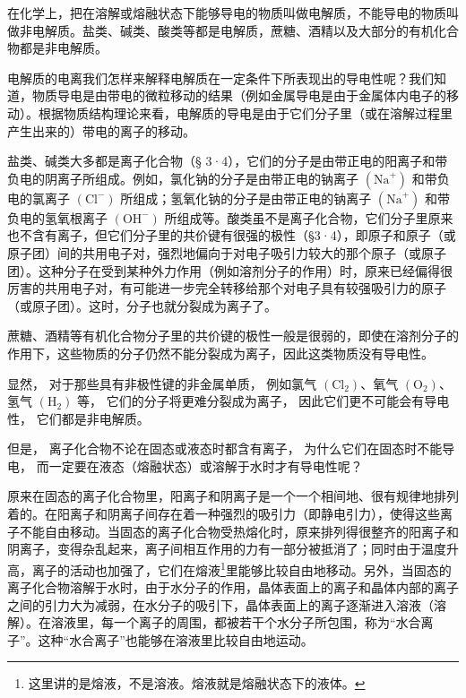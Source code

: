在化学上，把在溶解或熔融状态下能够导电的物质叫做电解质，不能导电的物质叫做非电解质。盐类、碱类、酸类等都是电解质，蔗糖、酒精以及大部分的有机化合物都是非电解质。

电解质的电离我们怎样来解释电解质在一定条件下所表现出的导电性呢？我们知道，物质导电是由带电的微粒移动的结果（例如金属导电是由于金属体内电子的移动）。根据物质结构理论来看，电解质的导电是由于它们分子里（或在溶解过程里产生出来的）带电的离子的移动。

盐类、碱类大多都是离子化合物（§
3·4），它们的分子是由带正电的阳离子和带负电的阴离子所组成。例如，氯化钠的分子是由带正电的钠离子
\(\left(\mathrm{Na}^{+}\right)\) 和带负电的氯离子
\(\left(\mathrm{Cl}^{-}\right)\)
所组成；氢氧化钠的分子是由带正电的钠离子
\(\left(\mathrm{Na}^{+}\right)\) 和带负电的氢氧根离子
\(\left(\mathrm{OH}^{-}\right)\)
所组成等。酸类虽不是离子化合物，它们分子里原来也不含有离子，但它们分子里的共价键有很强的极性（§3·4），即原子和原子（或原子团）间的共用电子对，强烈地偏向于对电子吸引力较大的那个原子（或原子团）。这种分子在受到某种外力作用（例如溶剂分子的作用）时，原来已经偏得很厉害的共用电子对，有可能进一步完全转移给那个对电子具有较强吸引力的原子（或原子团）。这时，分子也就分裂成为离子了。

蔗糖、酒精等有机化合物分子里的共价键的极性一般是很弱的，即使在溶剂分子的作用下，这些物质的分子仍然不能分裂成为离子，因此这类物质没有导电性。

显然， 对于那些具有非极性键的非金属单质， 例如氯气
\(\left(\mathrm{Cl}_{2}\right)\)、氧气
\(\left(\mathrm{O}_{2}\right)\)、氢气 \(\left(\mathrm{H}_{2}\right)\)
等， 它们的分子将更难分裂成为离子， 因此它们更不可能会有导电性，
它们都是非电解质。

但是， 离子化合物不论在固态或液态时都含有离子，
为什么它们在固态时不能导电，
而一定要在液态（熔融状态）或溶解于水时才有导电性呢？

原来在固态的离子化合物里，阳离子和阴离子是一个一个相间地、很有规律地排列着的。在阳离子和阴离子间存在着一种强烈的吸引力（即静电引力），使得这些离子不能自由移动。当固态的离子化合物受热熔化时，原来排列得很整齐的阳离子和阴离子，变得杂乱起来，离子间相互作用的力有一部分被抵消了；同时由于温度升高，离子的活动也加强了，它们在熔液\footnote{这里讲的是熔液，不是溶液。熔液就是熔融状态下的液体。}里能够比较自由地移动。另外，当固态的离子化合物溶解于水时，由于水分子的作用，晶体表面上的离子和晶体内部的离子之间的引力大为减弱，在水分子的吸引下，晶体表面上的离子逐渐进入溶液（溶解）。在溶液里，每一个离子的周围，都被若干个水分子所包围，称为``水合离子''。这种``水合离子''也能够在溶液里比较自由地运动。

